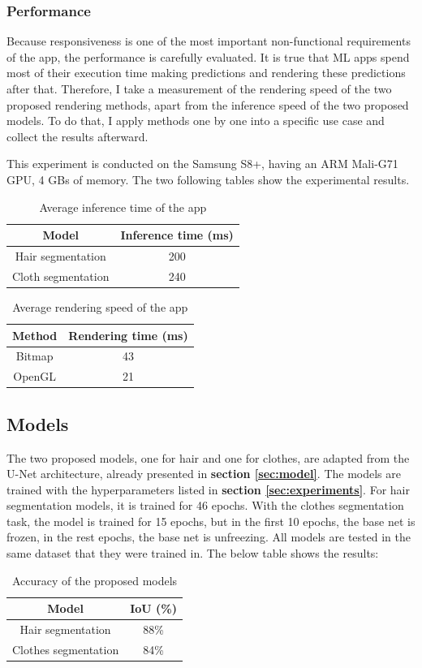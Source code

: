 \subsubsection{Performance}
Because responsiveness is one of the most important non-functional requirements of the app, the performance is carefully evaluated. It is true that ML apps spend most of their execution time making predictions and rendering these predictions after that. Therefore, I take a measurement of the rendering speed of the two proposed rendering methods, apart from the inference speed of the two proposed models. To do that, I apply methods one by one into a specific use case and collect the results afterward. \par
 
This experiment is conducted on the Samsung S8+, having an ARM Mali-G71 GPU, 4 GBs of memory. The two following tables show the experimental results.

\begin{table}[H]
\centering
\caption{Average inference time of the app} 
 \begin{tabular}{||c c||} 
 \hline
 Model & Inference time (ms) \\ [0.5ex] 
 \hline\hline
  Hair segmentation & 200\\ 
 Cloth segmentation & 240 \\ [1ex] 
 \hline
 \end{tabular}
\end{table}


\begin{table}[H]
\caption{Average rendering speed of the app} 
\centering
 \begin{tabular}{||c c||} 
 \hline
 Method & Rendering time (ms) \\ [0.5ex] 
 \hline\hline
  Bitmap & 43\\ 
 OpenGL & 21 \\ [1ex] 
 \hline
 \end{tabular}
\end{table}


\subsection{Models}

The two proposed models, one for hair and one for clothes, are adapted from the U-Net architecture, already presented in \textbf{section \ref{sec:model}}. The models are trained with the hyperparameters listed in \textbf{section \ref{sec:experiments}}. For hair segmentation models, it is trained for 46 epochs. With the clothes segmentation task, the model is trained for 15 epochs, but in the first 10 epochs, the base net is frozen, in the rest epochs, the base net is unfreezing. All models are tested in the same dataset that they were trained in. The below table shows the results:

\begin{table}[H]
\caption{Accuracy of the proposed models} 
\centering
 \begin{tabular}{||c c||} 
 \hline
 Model & IoU (\%) \\ [0.5ex] 
 \hline\hline
  Hair segmentation & 88\% \\ 
 Clothes segmentation & 84\% \\ [1ex] 
 \hline
 \end{tabular}
\end{table}

